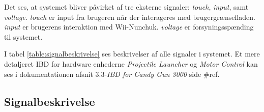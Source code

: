 \noindent Det ses, at systemet bliver påvirket af tre eksterne signaler: \textit{touch}, \textit{input}, samt \textit{voltage}. \textit{touch} er input fra brugeren når der interageres med brugergrænsefladen. \textit{input} er brugerens interaktion med Wii-Nunchuk. \textit{voltage} er forsyningsspænding til systemet.\newline

\noindent I tabel \ref{table:signalbeskrivelse} ses beskrivelser af alle signaler i systemet. Et mere detaljeret IBD for hardware enhederne \textit{Projectile Launcher} og \textit{Motor Control} kan ses i dokumentationen afsnit 3.3-\textit{IBD for Candy Gun 3000} side \#ref. 

\newpage
\subsection{Signalbeskrivelse}
